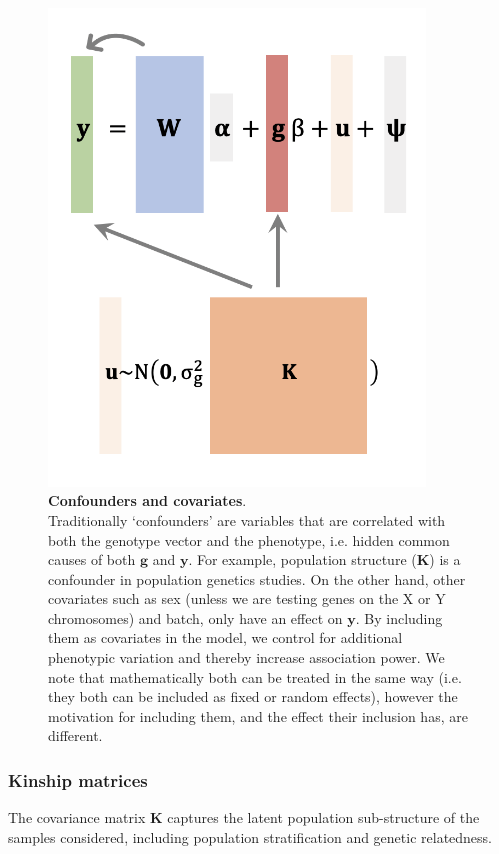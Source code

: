 \begin{figure}[htbp]
\centering
\includegraphics[width=10cm]{Chapter2/Fig/confounders_covariates.png}
\caption[Confounders and covariates]{\textbf{Confounders and covariates}.\\
Traditionally `confounders' are variables that are correlated with both the genotype vector and the phenotype, i.e. hidden common causes of both $\mathbf{g}$ and  $\mathbf{y}$. 
For example, population structure ($\mathbf{K}$) is a confounder in population genetics studies. 
On the other hand, other covariates such as sex (unless we are testing genes on the X or Y chromosomes) and batch, only have an effect on $\mathbf{y}$.
By including them as covariates in the model, we control for additional phenotypic variation and thereby increase association power. 
We note that mathematically both can be treated in the same way (i.e. they both can be included as fixed or random effects), however the motivation for including them, and the effect their inclusion has, are different.}
\label{fig:conf_cov}
\end{figure}


\subsubsection{Kinship matrices}
\label{sec:kinship_matrices}

The covariance matrix $\mathbf{K}$ captures the latent population sub-structure of the samples considered, including population stratification and genetic relatedness.\\


